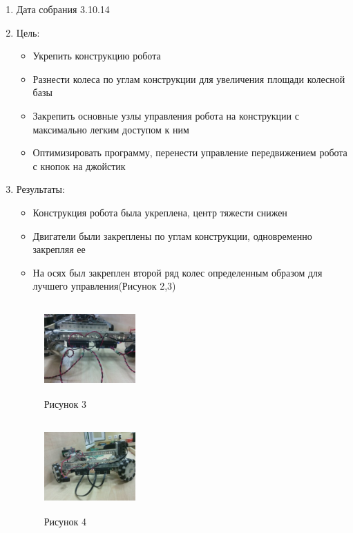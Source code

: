 
\begin{enumerate}
		\item Дата собрания 3.10.14
		\item Цель:
		\begin{itemize}
			\item Укрепить конструкцию робота
			\item Разнести колеса по углам конструкции для увеличения площади колесной базы
			\item Закрепить основные узлы управления робота на конструкции с максимально легким доступом к ним
			\item Оптимизировать программу, перенести управление передвижением робота с кнопок на джойстик
		\end{itemize}
		\item Результаты:
		\begin{itemize}
			\item Конструкция робота была укреплена, центр тяжести снижен 
			\item Двигатели были закреплены по углам конструкции, одновременно закрепляя ее
			\item На осях был закреплен второй ряд колес определенным образом для лучшего управления(Рисунок 2,3)
		\end{itemize}
		\begin{figure} [h]
			\centering
			\begin{minipage}{0.3\linewidth}
				\includegraphics[width=35mm,height=35mm]{3_1_robot}\\ Рисунок 3
			\end{minipage}
			\begin{minipage}{0.3\linewidth}
				\includegraphics[width=35mm,height=35mm]{3_2_robot}\\ Рисунок 4
			\end{minipage}

\end{figure}
\end{enumerate}
